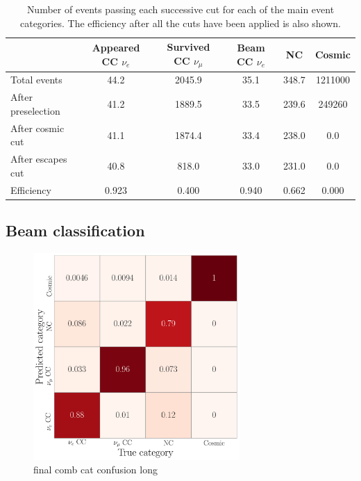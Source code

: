 \begin{table}
    \begin{tabular}{lccccc}
                           & Appeared CC $\nu_{e}$ & Survived CC $\nu_{\mu}$ & Beam CC $\nu_{e}$ & NC    & Cosmic  \\
        \midrule
        Total events       & 44.2                  & 2045.9                  & 35.1              & 348.7 & 1211000 \\
        After preselection & 41.2                  & 1889.5                  & 33.5              & 239.6 & 249260  \\
        After cosmic cut   & 41.1                  & 1874.4                  & 33.4              & 238.0 & 0.0     \\
        After escapes cut  & 40.8                  & 818.0                   & 33.0              & 231.0 & 0.0     \\
        \midrule
        Efficiency         & 0.923                 & 0.400                   & 0.940             & 0.662 & 0.000   \\
    \end{tabular}
    \caption[Number of events passing cuts for each event category.]
    {Number of events passing each successive cut for each of the main event categories.
        The efficiency after all the cuts have been applied is also shown.}
    \label{tab:selection}
\end{table}


\subsection{Beam classification} %
\label{sec:cvn_results_beam} %

\begin{figure} %
    \includegraphics[width=0.7\textwidth]{diagrams/6-cvn/chipsnet/final_comb_cat_confusion.pdf}
    \caption[final comb cat confusion short]
    {final comb cat confusion long}
    \label{fig:final_comb_cat_confusion}
\end{figure}


